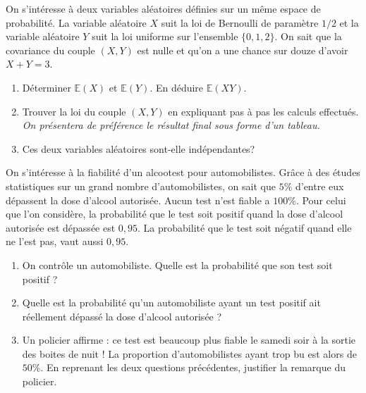\documentclass[a4paper,12pt,reqno]{amsart}
\begin{document}
\begin{exo}
  On s'intéresse à deux variables aléatoires définies sur un même
  espace de probabilité. La variable aléatoire $X$ suit la loi de Bernoulli de paramètre $1/2$ et la variable aléatoire $Y$ suit la loi uniforme sur l'ensemble $\{0,1,2\}$. On sait que la covariance du couple $(X,Y)$ est nulle et qu'on a une chance sur douze d'avoir $X+Y=3$.
  \begin{enumerate}
  \item Déterminer $\mathbb E(X)$ et $\mathbb E(Y)$. En déduire $\mathbb E(XY)$.
   \item Trouver la loi du couple $(X,Y)$ en expliquant pas à pas les calculs effectués.\\
    \emph{On présentera de préférence le résultat final sous forme d'un tableau.}
   \item Ces deux variables aléatoires sont-elle indépendantes?
  \end{enumerate}
\end{exo}

\begin{exo}
  On s'intéresse à la fiabilité d'un alcootest pour automobilistes. Grâce à des études statistiques sur un grand nombre d'automobilistes, on sait que $5\%$ d'entre eux dépassent la dose d'alcool autorisée. Aucun test n'est fiable a $100\%$. Pour celui que l'on considère, la probabilité que le test soit positif quand la dose d'alcool autorisée est dépassée est $0,95$. La probabilité que le test soit négatif quand elle ne l'est pas, vaut aussi $0,95$.
  \begin{enumerate}
    \item On contrôle un automobiliste. Quelle est la probabilité que son test soit positif ?
    \item Quelle est la probabilité qu'un automobiliste ayant un test positif ait réellement dépassé la dose d'alcool autorisée ?
    \item Un policier affirme : ce test est beaucoup plus fiable le samedi soir à la sortie des boites de nuit ! La proportion d'automobilistes ayant trop bu est alors de $50\%$. En reprenant les deux questions précédentes, justifier la remarque du policier.
  \end{enumerate}
\end{exo}
\medskip
\end{document}
